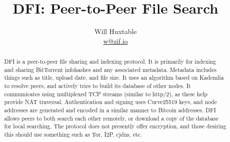 \newcommand{\subtitle}[1]{%
  \posttitle{%
    \par\end{center}
    \begin{center}\large#1\end{center}
    \vskip0.5em}%
}

{
	\fancyhf{}
	\renewcommand{\headrulewidth}{0pt}
	\renewcommand{\footrulewidth}{0.4pt}
}

\title{\textbf{DFI: Peer-to-Peer File Search}}
\author{Will Huxtable \\ \href{mailto:w@zif.io}{w@zif.io}}

\maketitle
\thispagestyle{titlepage}

\vspace{\fill}
\begin{abstract}
	DFI is a peer-to-peer file sharing and indexing protocol. It is primarily
	for indexing and sharing BitTorrent infohashes and any associated metadata.
	Metadata includes things such as title, upload date, and file size.  It uses
	an algorithm based on Kademlia to resolve peers, and actively tries to build
	its database of other nodes. It communicates using multiplexed TCP streams
	(similar to http/2), as these help provide NAT traversal.  Authentication
	and signing uses Curve25519 keys, and node addresses are generated and
	encoded in a similar manner to Bitcoin addresses. DFI allows peers to both
	search each other remotely, or download a copy of the database for local
	searching. The protocol does not presently offer encryption, and those
	desiring this should use something such as Tor, I2P, cjdns, etc.
\end{abstract}
\vspace{\fill}
